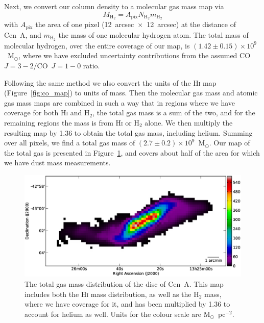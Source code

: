 Next, we convert our column density to a molecular gas mass map via
\begin{equation}\label{eqn:mol_gas_mass}
M_{\mathrm{H}_{2}} = A_{\mathrm{pix}} N_{\mathrm{H}_{2}} m_{\mathrm{H}_{2}}
\end{equation}
with $A_{\mathrm{pix}}$ the area of one pixel (12~arcsec~$\times$~12~arcsec) at the distance of Cen~A, and $m_{\mathrm{H}_{2}}$ the mass of one molecular hydrogen atom.  The total mass of molecular hydrogen, over the entire coverage of our map, is $(1.42 \pm 0.15) \times 10^{9}$~M$_{\odot}$, where we have excluded uncertainty contributions from the assumed CO~$J=3-2$/CO~$J=1-0$ ratio.

Following the same method we also convert the units of the H\textsc{i} map (Figure~\ref{fig:co_map}) to units of mass.  Then the molecular gas mass and atomic gas mass maps are combined in such a way that in regions where we have coverage for both H\textsc{i} and H$_{2}$, the total gas mass is a sum of the two, and for the remaining regions the mass is from H\textsc{i} or H$_{2}$ alone.  We then multiply the resulting map by 1.36 to obtain the total gas mass, including helium.  Summing over all pixels, we find a total gas mass of $(2.7 \pm 0.2)\times 10^{9}$~M$_{\odot}$.  Our map of the total gas is presented in Figure~\ref{fig:gas}, and covers about half of the area for which we have dust mass measurements.

\begin{figure}
\includegraphics[width=\columnwidth]{ch2/Fig6_CenA_tot_gas_mass}
\caption[The total gas mass distribution of the disc of Centaurus~A]{The total gas mass distribution of the disc of Cen~A.  This map includes both the H\textsc{i} mass distribution, as well as the H$_{2}$ mass, where we have coverage for it, and has been multiplied by 1.36 to account for helium as well.  Units for the colour scale are M$_{\odot}$~pc$^{-2}$.}
\label{fig:gas}
\end{figure}


